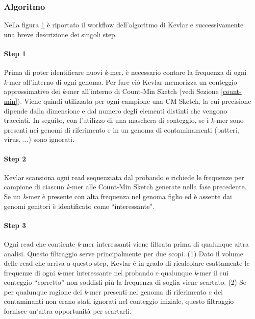 \documentclass[../main.tex]{subfiles}
\begin{document}
\subsubsection{Algoritmo}

Nella figura \ref{fig:kevlar_pipeline} è riportato il workflow dell'algoritmo di Kevlar e successivamente una breve descrizione dei singoli step.

\begin{figure}[h!]
	\centering
  	\captionsetup{justification=centering}
  	\caption{}
  	\label{fig:kevlar_pipeline}
\end{figure}

\paragraph{Step 1} Prima di poter identificare nuovi \textit{k}-mer, è necessario contare la frequenza di ogni \textit{k}-mer all'interno di ogni genoma. Per fare ciò Kevlar memorizza un conteggio approssimativo dei \textit{k}-mer all'interno di Count-Min Sketch (vedi Sezione \ref{count-min}).  Viene quindi utilizzata per ogni campione una CM Sketch, la cui precisione dipende dalla dimensione e dal numero degli elementi distinti che vengono tracciati. In seguito, con l'utilizzo di una maschera di conteggio, se i \textit{k}-mer sono presenti nei genomi di riferimento e in un genoma di contaminamenti (batteri, virus, ...) sono ignorati.

\paragraph{Step 2} Kevlar scansiona ogni read sequenziata dal probando e richiede le frequenze per campione di ciascun \textit{k}-mer alle Count-Min Sketch generate nella fase precedente. Se un \textit{k}-mer è presente con alta frequenza nel genoma figlio ed è assente dai genomi genitori è identificato come ``interessante". 

\paragraph{Step 3} Ogni read che contiente \textit{k}-mer interessanti viene filtrata prima di qualunque altra analisi. Questo filtraggio serve principalmente per due scopi. (1) Dato il volume delle read che arriva a questo step, Kevlar è in grado di ricalcolare esattamente le frequenze di ogni \textit{k}-mer interessante nel probando e qualunque \textit{k}-mer il cui conteggio ``corretto'' non soddisfi più la frequenza di soglia viene scartato. (2) Se per qualunque ragione dei \textit{k}-mer presenti nel genoma di riferimento e dei contaminanti non erano stati ignorati nel conteggio iniziale, questo filtraggio fornisce un'altra opportunità per scartarli. 
\end{document}
